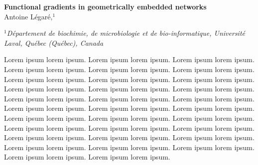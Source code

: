 \documentclass{article}
\begin{document}
\begin{center}

    {\Large \textbf{Functional gradients in geometrically embedded networks}}\\
    
    \vspace{10 pt}
    Antoine Légaré,$^{1}$ \\
    \vspace{5 pt}
    
    $^1$\textit{Département de biochimie, de microbiologie et de bio-informatique, Université Laval, Québec (Québec), Canada}\\
    

\end{center}

\vspace{4 pt}

Lorem ipsum lorem ipsum. Lorem ipsum lorem ipsum. Lorem ipsum lorem ipsum. Lorem ipsum lorem ipsum. Lorem ipsum lorem ipsum. Lorem ipsum lorem ipsum. Lorem ipsum lorem ipsum. Lorem ipsum lorem ipsum. Lorem ipsum lorem ipsum. Lorem ipsum lorem ipsum. Lorem ipsum lorem ipsum. Lorem ipsum lorem ipsum. Lorem ipsum lorem ipsum. Lorem ipsum lorem ipsum. Lorem ipsum lorem ipsum. Lorem ipsum lorem ipsum. Lorem ipsum lorem ipsum. Lorem ipsum lorem ipsum. Lorem ipsum lorem ipsum. Lorem ipsum lorem ipsum. Lorem ipsum lorem ipsum. Lorem ipsum lorem ipsum. Lorem ipsum lorem ipsum. Lorem ipsum lorem ipsum. Lorem ipsum lorem ipsum. Lorem ipsum lorem ipsum. Lorem ipsum lorem ipsum. Lorem ipsum lorem ipsum. Lorem ipsum lorem ipsum. Lorem ipsum lorem ipsum. Lorem ipsum lorem ipsum. Lorem ipsum lorem ipsum.

\vspace{10 pt}
\end{document}

